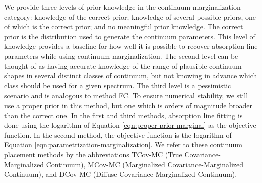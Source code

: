 \documentclass[trackchanges]{aastex62}
\begin{document}
{We provide three levels of prior knowledge in the continuum marginalization category: knowledge of the correct prior; knowledge of several possible priors, one of which is the correct prior; and no meaningful prior knowledge.
The correct prior is the distribution used to generate the continuum parameters.
This level of knowledge provides a baseline for how well it is possible to recover absorption line parameters while using continuum marginalization.
The second level can be thought of as having accurate knowledge of the range of plausible continuum shapes in several distinct classes of continuum, but not knowing in advance which class should be used for a given spectrum.
The third level is a pessimistic scenario and is analogous to method FC.
To ensure numerical stability, we still use a proper prior in this method, but one which is orders of magnitude broader than the correct one.
In the first and third methods, absorption line fitting is done using the logarithm of Equation \ref{eqn:proper-prior-marginal} as the objective function.
In the second method, the objective function is the logarithm of Equation \ref{eqn:parametrization-marginalization}.
We refer to these continuum placement methods by the abbreviations TCov-MC (True Covariance-Marginalized Continuum), MCov-MC (Marginalized Covariance-Marginalized Continuum), and DCov-MC (Diffuse Covariance-Marginalized Continuum).

}
\end{document}
